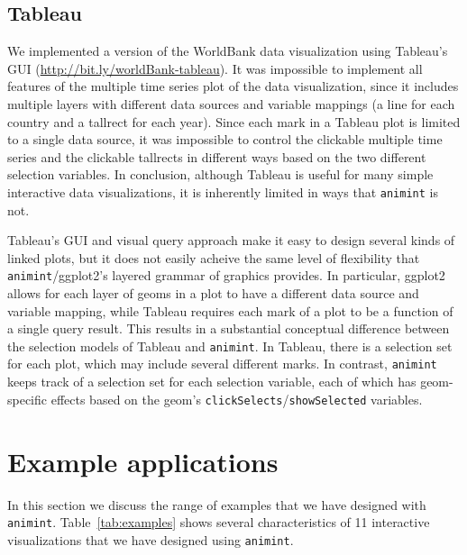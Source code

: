 \documentclass[12pt]{article}\usepackage[]{graphicx}\usepackage[]{color}
\begin{document}
\subsection{Tableau}

We implemented a version of the WorldBank data visualization using
Tableau's GUI (\url{http://bit.ly/worldBank-tableau}).
It was impossible to implement all features of the multiple time
series plot of the data visualization, since it includes multiple
layers with different data sources and variable mappings (a line for
each country and a tallrect for each year). Since each mark in a
Tableau plot is limited to a single data source, it was impossible to
control the clickable multiple time series and the clickable tallrects
in different ways based on the two different selection variables. In
conclusion, although Tableau is useful for many simple interactive
data visualizations, it is inherently limited in ways that \texttt{animint} is not.

Tableau's GUI and visual query approach
make it easy to design several kinds of linked plots, but it does not
easily acheive the same level of flexibility that \texttt{animint}/ggplot2's
layered grammar of graphics provides. In particular, ggplot2 allows
for each layer of geoms in a plot to have a different data source and
variable mapping, while Tableau requires each mark of a plot to be a
function of a single query result. This results in a substantial
conceptual difference between the selection models of Tableau and
\texttt{animint}. In Tableau, there is a selection set for each plot, which may
include several different marks. In contrast, \texttt{animint} keeps track of a
selection set for each selection variable, each of which has
geom-specific effects based on the geom's \texttt{clickSelects}/\texttt{showSelected}
variables.


\section{Example applications}

In this section we discuss the range of examples that we have designed
with \texttt{animint}. Table~\ref{tab:examples} shows several characteristics
of 11 interactive visualizations that we have designed using
\texttt{animint}.
\end{document}
